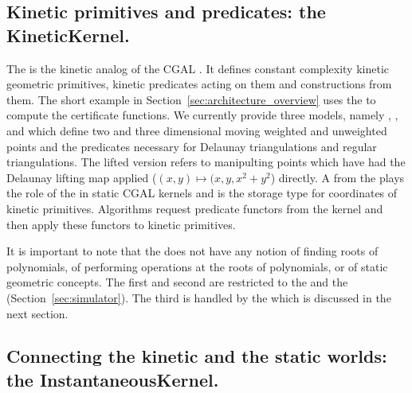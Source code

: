 \subsection{Kinetic primitives and predicates: the KineticKernel.}
\label{sec:kinetic_kernel}

The  is the kinetic analog of the CGAL
. It defines constant complexity kinetic geometric
primitives, kinetic predicates acting on them and constructions from
them. The short example in Section~\ref{sec:architecture_overview}
uses the  to compute the 
certificate functions. We currently provide three models, namely
,
,
and
which define two and three dimensional moving weighted and unweighted
points and the predicates necessary for Delaunay triangulations and
regular triangulations. The lifted version refers to manipulting
points which have had the Delaunay lifting map applied ($(x,y) \mapsto
(x,y,x^2+y^2$) directly.  A  from the
 plays the role of the  in static CGAL
kernels and is the storage type for coordinates of kinetic
primitives. Algorithms request predicate functors from the kernel and
then apply these functors to kinetic primitives.

It is important to note that the  does not have any notion of
finding roots of polynomials, of performing operations at the roots of
polynomials, or of static geometric concepts. The first and second are
restricted to the  and the 
(Section~\ref{sec:simulator}). The third is handled by the  which
is discussed in the next section.

\subsection{Connecting the kinetic and the static worlds: the InstantaneousKernel.}
\label{sec:instantaneous_kernel}

